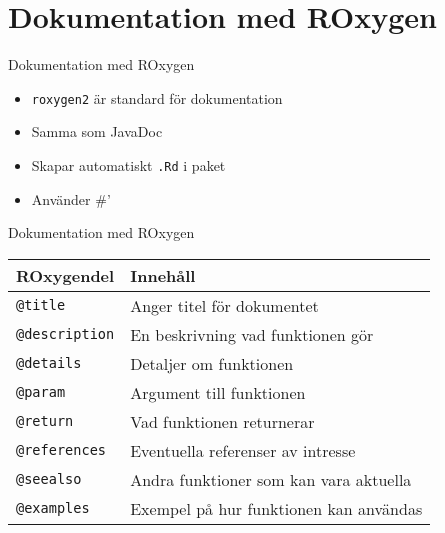 \documentclass[
  11pt,
  ignorenonframetext,
]{beamer}
\providecommand{\tightlist}{%
  \setlength{\itemsep}{0pt}\setlength{\parskip}{0pt}}
\begin{document}
\hypertarget{dokumentation-med-roxygen}{%
\section{Dokumentation med ROxygen}\label{dokumentation-med-roxygen}}

\begin{frame}{Dokumentation med ROxygen}
\protect\hypertarget{dokumentation-med-roxygen-1}{}
\begin{itemize}
\tightlist
\item
  \texttt{roxygen2} är standard för dokumentation
\item
  Samma som JavaDoc
\item
  Skapar automatiskt \texttt{.Rd} i paket
\item
  Använder \#'
\end{itemize}
\end{frame}

\begin{frame}[fragile]{Dokumentation med ROxygen}
\protect\hypertarget{dokumentation-med-roxygen-2}{}
\begin{longtable}[]{@{}ll@{}}
\toprule
ROxygendel & Innehåll \\
\midrule
\endhead
\texttt{@title} & Anger titel för dokumentet \\
\texttt{@description} & En beskrivning vad funktionen gör \\
\texttt{@details} & Detaljer om funktionen \\
\texttt{@param} & Argument till funktionen \\
\texttt{@return} & Vad funktionen returnerar \\
\texttt{@references} & Eventuella referenser av intresse \\
\texttt{@seealso} & Andra funktioner som kan vara aktuella \\
\texttt{@examples} & Exempel på hur funktionen kan användas \\
\bottomrule
\end{longtable}
\end{frame}
\end{document}
